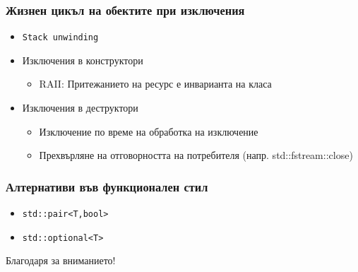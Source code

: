 \documentclass{beamer}
\begin{document}
\begin{frame}[fragile]
  \frametitle{Жизнен цикъл на обектите при изключения}

  \begin{itemize}
    \item \texttt{Stack unwinding}
    \item Изключения в конструктори
    \begin{itemize}
        \item RAII: Притежанието на ресурс е инварианта на класа
    \end{itemize}    
    \item Изключения в деструктори
    \begin{itemize}
      \item Изключение по време на обработка на изключение
      \item Прехвърляне на отговорността на потребителя (напр. std::fstream::close)
    \end{itemize}
  \end{itemize}

\end{frame}


\begin{frame}[fragile]
  \frametitle{Алтернативи във функционален стил}

  \begin{itemize}
    \item \verb#std::pair<T,bool>#
    \item \verb#std::optional<T>#
  \end{itemize}
\end{frame}

\begin{frame}
\centerline{Благодаря за вниманието!}
\end{frame}
\end{document}
